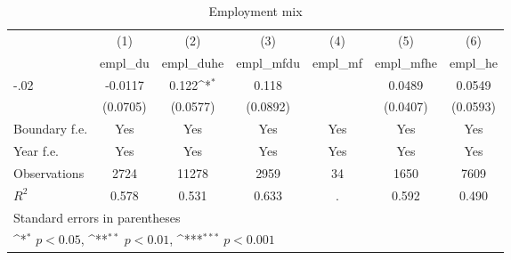 \begin{table}[htbp]\centering
\def\sym#1{\ifmmode^{#1}\else\(^{#1}\)\fi}
\caption{Employment mix}
\begin{tabular}{l*{6}{c}}
\hline\hline
                    &\multicolumn{1}{c}{(1)}&\multicolumn{1}{c}{(2)}&\multicolumn{1}{c}{(3)}&\multicolumn{1}{c}{(4)}&\multicolumn{1}{c}{(5)}&\multicolumn{1}{c}{(6)}\\
                    &\multicolumn{1}{c}{empl\_du}&\multicolumn{1}{c}{empl\_duhe}&\multicolumn{1}{c}{empl\_mfdu}&\multicolumn{1}{c}{empl\_mf}&\multicolumn{1}{c}{empl\_mfhe}&\multicolumn{1}{c}{empl\_he}\\
\hline
-.02                &     -0.0117         &       0.122\sym{*}  &       0.118         &                     &      0.0489         &      0.0549         \\
                    &    (0.0705)         &    (0.0577)         &    (0.0892)         &                     &    (0.0407)         &    (0.0593)         \\
[1em]
Boundary f.e.       &         Yes         &         Yes         &         Yes         &         Yes         &         Yes         &         Yes         \\
[1em]
Year f.e.           &         Yes         &         Yes         &         Yes         &         Yes         &         Yes         &         Yes         \\
\hline
Observations        &        2724         &       11278         &        2959         &          34         &        1650         &        7609         \\
\(R^{2}\)           &       0.578         &       0.531         &       0.633         &           .         &       0.592         &       0.490         \\
\hline\hline
\multicolumn{7}{l}{\footnotesize Standard errors in parentheses}\\
\multicolumn{7}{l}{\footnotesize \sym{*} \(p<0.05\), \sym{**} \(p<0.01\), \sym{***} \(p<0.001\)}\\
\end{tabular}
\end{table}
